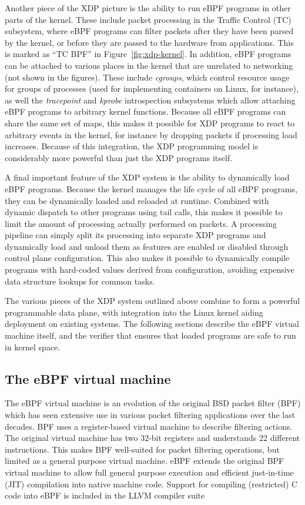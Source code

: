 \documentclass[10pt,sigconf]{acmart}
\begin{document}
Another piece of the XDP picture is the ability to run eBPF programs in other
parts of the kernel. These include packet processing in the Traffic Control (TC)
subsystem, where eBPF programs can filter packets after they have been parsed by
the kernel, or before they are passed to the hardware from applications. This is
marked as ``TC BPF'' in Figure~\ref{fig:xdp-kernel}. In addition, eBPF programs
can be attached to various places in the kernel that are unrelated to networking
(not shown in the figures). These include \emph{cgroups}, which control resource
usage for groups of processes (used for implementing containers on Linux, for
instance), as well the \emph{tracepoint} and \emph{kprobe} introspection
subsystems which allow attaching eBPF programs to arbitrary kernel functions.
Because all eBPF programs can share the same set of maps, this makes it possible
for XDP programs to react to arbitrary events in the kernel, for instance by
dropping packets if processing load increases. Because of this integration, the
XDP programming model is considerably more powerful than just the XDP programs
itself.

A final important feature of the XDP system is the ability to dynamically load
eBPF programs. Because the kernel manages the life cycle of all eBPF programs,
they can be dynamically loaded and reloaded at runtime. Combined with dynamic
dispatch to other programs using tail calls, this makes it possible to limit the
amount of processing actually performed on packets. A processing pipeline can
simply split its processing into separate XDP programs and dynamically load and
unload them as features are enabled or disabled through control plane
configuration. This also makes it possible to dynamically compile programs with
hard-coded values derived from configuration, avoiding expensive data structure
lookups for common tasks.

The various pieces of the XDP system outlined above combine to form a powerful
programmable data plane, with integration into the Linux kernel aiding
deployment on existing systems. The following sections describe the eBPF virtual
machine itself, and the verifier that ensures that loaded programs are safe to
run in kernel space.

\subsection{The eBPF virtual machine}
\label{sec:bpf-vm}
The eBPF virtual machine is an evolution of the original BSD packet filter (BPF)
\cite{mccanne_bsd_1993} which has seen extensive use in various packet filtering
applications over the last decades. BPF uses a register-based virtual machine to
describe filtering actions. The original virtual machine has two 32-bit registers and
understands 22 different instructions. This makes BPF well-suited for packet
filtering operations, but limited as a general purpose virtual machine. eBPF
extends the original BPF virtual machine to allow full general purpose execution
and efficient just-in-time (JIT) compilation into native machine code. Support
for compiling (restricted) C code into eBPF is included in the LLVM compiler
suite
\end{document}
